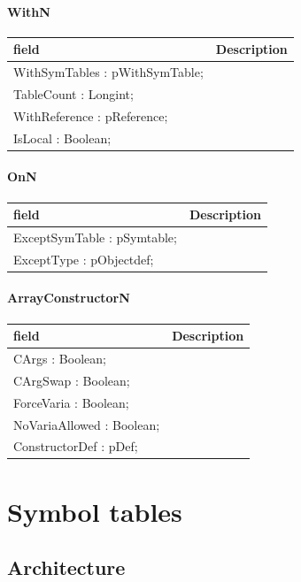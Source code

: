 \documentclass [a4paper,12pt]{article}
\begin{document}
\paragraph{WithN}\mbox{}

\begin{longtable}{|l|p{10cm}|}
\hline
field	& Description \\
\hline
\endhead
\hline
\endfoot
\textsf{WithSymTables : pWithSymTable;} &  \\
\textsf{TableCount : Longint;}		&  \\
\textsf{WithReference : pReference;}	&  \\
\textsf{IsLocal : Boolean;}		& 
\label{tab32}
\end{longtable}

\paragraph{OnN}\mbox{}

\begin{longtable}{|l|p{10cm}|}
\hline
field	& Description \\
\hline
\endhead
\hline
\endfoot
\textsf{ExceptSymTable : pSymtable;}&  \\
\textsf{ExceptType : pObjectdef;}& 
\label{tab33}
\end{longtable}

\paragraph{ArrayConstructorN}\mbox{}

\begin{longtable}{|l|p{10cm}|}
\hline
field	& Description \\
\hline
\endhead
\hline
\endfoot
\textsf{CArgs : Boolean;}		&  \\
\textsf{CArgSwap : Boolean;}		&  \\
\textsf{ForceVaria : Boolean;}		&  \\
\textsf{NoVariaAllowed : Boolean;}	&  \\
\textsf{ConstructorDef : pDef;}		& 
\label{tab34}
\end{longtable}

\section{Symbol tables}
\label{sec:symbol}

\subsection{Architecture}
\label{subsec:architecturesructord}
\end{document}
